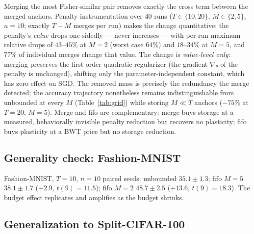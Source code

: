 \documentclass[review,12pt,number]{elsarticle}
\begin{document}
Merging the most Fisher-similar pair removes exactly the cross term
between the merged anchors. Penalty instrumentation over $40$ runs
($T \in \{10,20\}$, $M \in \{2,5\}$, $n{=}10$; exactly $T{-}M$ merges
per run) makes the change quantitative: the penalty's \emph{value} drops
one-sidedly --- never increases --- with per-run maximum relative
drops of $43$--$45\%$ at $M{=}2$ (worst case $64\%$) and $18$--$34\%$
at $M{=}5$, and $77\%$ of individual merges change that value. The
change is \emph{value-level only}: merging preserves the first-order
quadratic regularizer (the gradient $\nabla_\theta$ of the penalty is
unchanged), shifting only the parameter-independent constant, which
has zero effect on SGD. The removed mass is precisely the redundancy
the merge detected; the
accuracy trajectory nonetheless remains indistinguishable from
unbounded at every $M$ (Table~\ref{tab:grid}) while storing
$M \ll T$ anchors ($-75\%$ at $T{=}20$, $M{=}5$).
Merge and fifo are complementary: merge buys storage at a measured,
behaviorally invisible penalty reduction but recovers no plasticity;
fifo buys plasticity at a BWT price but no storage reduction.

\subsection{Generality check: Fashion-MNIST}
\label{sec:exp-fashion}

Fashion-MNIST, $T{=}10$, $n{=}10$ paired seeds: unbounded
$35.1\pm1.3$; fifo $M{=}5$ $38.1\pm1.7$ ($+2.9$, $t(9){=}11.5$); fifo
$M{=}2$ $48.7\pm2.5$ ($+13.6$, $t(9){=}18.3$). The budget
effect replicates and amplifies as the budget shrinks.

\subsection{Generalization to Split-CIFAR-100}
\label{sec:exp-cifar}
\end{document}
